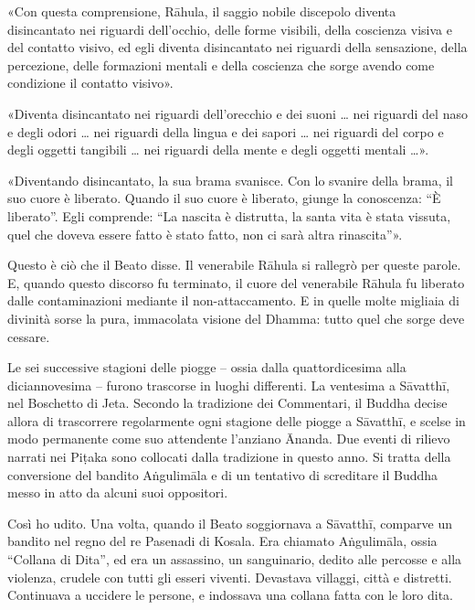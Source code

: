 «Con questa comprensione, Rāhula, il saggio nobile discepolo
diventa disincantato nei riguardi dell’occhio, delle forme visibili,
della coscienza visiva e del contatto visivo, ed egli diventa
disincantato nei riguardi della sensazione, della percezione, delle
formazioni mentali e della coscienza che sorge avendo come condizione il
contatto visivo».


«Diventa disincantato nei riguardi dell’orecchio e dei suoni … nei
riguardi del naso e degli odori … nei riguardi della lingua e dei sapori
… nei riguardi del corpo e degli oggetti tangibili … nei riguardi della
mente e degli oggetti mentali …».


«Diventando disincantato, la sua brama svanisce. Con lo svanire della
brama, il suo cuore è liberato. Quando il suo cuore è liberato, giunge
la conoscenza: “È liberato”. Egli comprende: “La nascita è distrutta, la
santa vita è stata vissuta, quel che doveva essere fatto è stato fatto,
non ci sarà altra rinascita”».


Questo è ciò che il Beato disse. Il venerabile Rāhula si rallegrò per
queste parole. E, quando questo discorso fu terminato, il cuore del
venerabile Rāhula fu liberato dalle contaminazioni mediante il
non-attaccamento. E in quelle molte migliaia di divinità sorse la pura,
immacolata visione del Dhamma: tutto quel che sorge deve cessare.




 Le sei successive stagioni delle piogge – ossia dalla
quattordicesima alla diciannovesima – furono trascorse in luoghi
differenti. La ventesima a Sāvatthī, nel Boschetto di Jeta. Secondo la
tradizione dei Commentari, il Buddha decise allora di trascorrere
regolarmente ogni stagione delle piogge a Sāvatthī, e scelse in modo
permanente come suo attendente l’anziano Ānanda. Due eventi di rilievo
narrati nei Piṭaka sono collocati dalla tradizione in questo anno. Si
tratta della conversione del bandito Aṅgulimāla e di un tentativo di
screditare il Buddha messo in atto da alcuni suoi oppositori.


 Così ho udito. Una volta, quando il Beato soggiornava a
Sāvatthī, comparve un bandito nel regno del re Pasenadi di Kosala. Era
chiamato Aṅgulimāla, ossia “Collana di Dita”, ed era un assassino, un
sanguinario, dedito alle percosse e alla violenza, crudele con tutti gli
esseri viventi. Devastava villaggi, città e distretti. Continuava a
uccidere le persone, e indossava una collana fatta con le loro dita.


